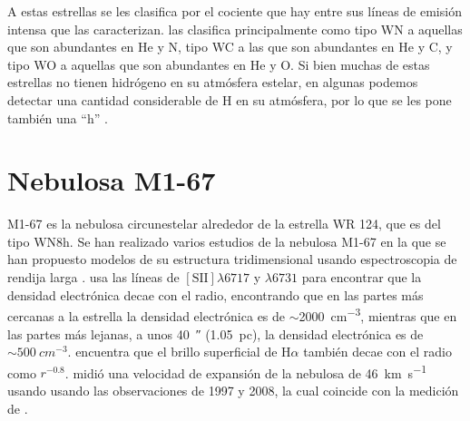 \documentclass{book}
\begin{document}
A estas estrellas se les clasifica por el cociente que hay entre sus líneas de emisión intensa que las caracterizan. \cite{VanDerHutch:2001} las clasifica principalmente como tipo WN a aquellas que son abundantes en He y N, tipo WC a las que son abundantes en He y C, y tipo WO a aquellas que son abundantes en He y O. Si bien muchas de estas estrellas no tienen hidrógeno en su atmósfera estelar, en algunas podemos detectar una cantidad considerable de H en su atmósfera, por lo que se les pone también una ``h'' \citep{SSM:1996}.



\section{Nebulosa M1-67}

M1-67 es la nebulosa circunestelar alrededor de la estrella WR 124, que es del tipo WN8h. 
Se han realizado varios estudios de la nebulosa M1-67 en la que se han propuesto modelos de su estructura tridimensional usando espectroscopia de rendija larga \citep{Zavala:2022}. \cite{Marcel:2021} usa las líneas de $[\mathrm{S \scriptstyle{II}}]\lambda6717$ y $\lambda6731$ para encontrar que la densidad electrónica decae con el radio, encontrando que en las partes más cercanas a la estrella la densidad electrónica es de $\sim$\SI{2000}{cm^{-3}}, mientras que en las partes más lejanas, a unos \SI{40}{\arcsecond} (\SI{1.05}{pc}), la densidad electrónica es de $\sim\SI{500}{cm^{-3}}$. \cite{Grosdidier:1998} encuentra que el brillo superficial de H$\alpha$ también decae con el radio como $r^{-0.8}$. \cite{Mancherko:2010} midió una velocidad de expansión de la nebulosa de \SI{46}{km.s^{-1}} usando usando las observaciones de 1997 \citep{Grosdidier:1998} y 2008, la cual coincide con la medición de \cite{Zavala:2022}. 
\end{document}
